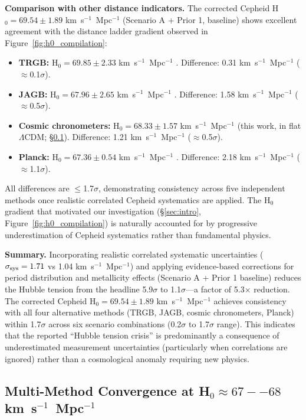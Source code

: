 \documentclass[preprint, linenumbers]{aastex701}
\begin{document}
\textbf{Comparison with other distance indicators.} The corrected Cepheid H$_0 = 69.54 \pm 1.89$ km~s$^{-1}$~Mpc$^{-1}$ (Scenario A + Prior 1, baseline) shows excellent agreement with the distance ladder gradient observed in Figure~\ref{fig:h0_compilation}:
\begin{itemize}
\item \textbf{TRGB:} H$_0 = 69.85 \pm 2.33$ km~s$^{-1}$~Mpc$^{-1}$ \citep{Freedman2025a}. Difference: 0.31 km~s$^{-1}$~Mpc$^{-1}$ ($\approx$0.1$\sigma$).
\item \textbf{JAGB:} H$_0 = 67.96 \pm 2.65$ km~s$^{-1}$~Mpc$^{-1}$ \citep{Freedman2025a}. Difference: 1.58 km~s$^{-1}$~Mpc$^{-1}$ ($\approx$0.5$\sigma$).
\item \textbf{Cosmic chronometers:} H$_0 = 68.33 \pm 1.57$ km~s$^{-1}$~Mpc$^{-1}$ (this work, in flat $\Lambda$CDM; \S\ref{sec:results_convergence}). Difference: 1.21 km~s$^{-1}$~Mpc$^{-1}$ ($\approx$0.5$\sigma$).
\item \textbf{Planck:} H$_0 = 67.36 \pm 0.54$ km~s$^{-1}$~Mpc$^{-1}$ \citep{Planck2018}. Difference: 2.18 km~s$^{-1}$~Mpc$^{-1}$ ($\approx$1.1$\sigma$).
\end{itemize}

All differences are $\leq$1.7$\sigma$, demonstrating consistency across five independent methods once realistic correlated Cepheid systematics are applied. The H$_0$ gradient that motivated our investigation (\S\ref{sec:intro}, Figure~\ref{fig:h0_compilation}) is naturally accounted for by progressive underestimation of Cepheid systematics rather than fundamental physics.

\textbf{Summary.} Incorporating realistic correlated systematic uncertainties ($\sigma_{\rm sys} = 1.71$ vs 1.04 km~s$^{-1}$~Mpc$^{-1}$) and applying evidence-based corrections for period distribution and metallicity effects (Scenario A + Prior 1 baseline) reduces the Hubble tension from the headline 5.9$\sigma$ to 1.1$\sigma$---a factor of 5.3$\times$ reduction. The corrected Cepheid H$_0 = 69.54 \pm 1.89$ km~s$^{-1}$~Mpc$^{-1}$ achieves consistency with all four alternative methods (TRGB, JAGB, cosmic chronometers, Planck) within 1.7$\sigma$ across six scenario combinations (0.2$\sigma$ to 1.7$\sigma$ range). This indicates that the reported ``Hubble tension crisis'' is predominantly a consequence of underestimated measurement uncertainties (particularly when correlations are ignored) rather than a cosmological anomaly requiring new physics.

\subsection{Multi-Method Convergence at H$_0 \approx 67--68$ km~s$^{-1}$~Mpc$^{-1}$}
\label{sec:results_convergence}
\end{document}

